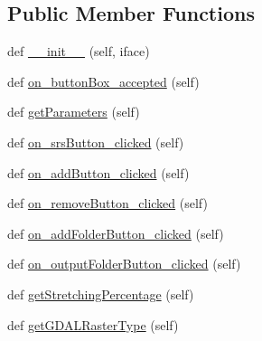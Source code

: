 \subsection*{Public Member Functions}
\begin{DoxyCompactItemize}
\item 
def \mbox{\hyperlink{class_dsg_tools_1_1_image_tools_1_1processing_tools_1_1_processing_tools_a5ebd71ec68e98d15a543a3b7a17674f4}{\+\_\+\+\_\+init\+\_\+\+\_\+}} (self, iface)
\item 
def \mbox{\hyperlink{class_dsg_tools_1_1_image_tools_1_1processing_tools_1_1_processing_tools_afd52af3160c2c4221b8cb58b2b8e2ae9}{on\+\_\+button\+Box\+\_\+accepted}} (self)
\item 
def \mbox{\hyperlink{class_dsg_tools_1_1_image_tools_1_1processing_tools_1_1_processing_tools_a07fd0be59b4c07136425c265f6f50a48}{get\+Parameters}} (self)
\item 
def \mbox{\hyperlink{class_dsg_tools_1_1_image_tools_1_1processing_tools_1_1_processing_tools_aa0df9a281d6ad0cf4ce21f75789bde45}{on\+\_\+srs\+Button\+\_\+clicked}} (self)
\item 
def \mbox{\hyperlink{class_dsg_tools_1_1_image_tools_1_1processing_tools_1_1_processing_tools_a375edc578937df2680546fcc63a15c9d}{on\+\_\+add\+Button\+\_\+clicked}} (self)
\item 
def \mbox{\hyperlink{class_dsg_tools_1_1_image_tools_1_1processing_tools_1_1_processing_tools_a9f3d95579c91445c59fdccf7b9ef09a5}{on\+\_\+remove\+Button\+\_\+clicked}} (self)
\item 
def \mbox{\hyperlink{class_dsg_tools_1_1_image_tools_1_1processing_tools_1_1_processing_tools_a88953ffad9619128d85cd444564b0b7c}{on\+\_\+add\+Folder\+Button\+\_\+clicked}} (self)
\item 
def \mbox{\hyperlink{class_dsg_tools_1_1_image_tools_1_1processing_tools_1_1_processing_tools_a96c93e9a3401f46a7280ce394031513e}{on\+\_\+output\+Folder\+Button\+\_\+clicked}} (self)
\item 
def \mbox{\hyperlink{class_dsg_tools_1_1_image_tools_1_1processing_tools_1_1_processing_tools_a8e44625823c548a4773b69fa21f6a3fe}{get\+Stretching\+Percentage}} (self)
\item 
def \mbox{\hyperlink{class_dsg_tools_1_1_image_tools_1_1processing_tools_1_1_processing_tools_a3463e8196d90002c4324ebb84a8f5bc9}{get\+G\+D\+A\+L\+Raster\+Type}} (self)
\end{DoxyCompactItemize}
